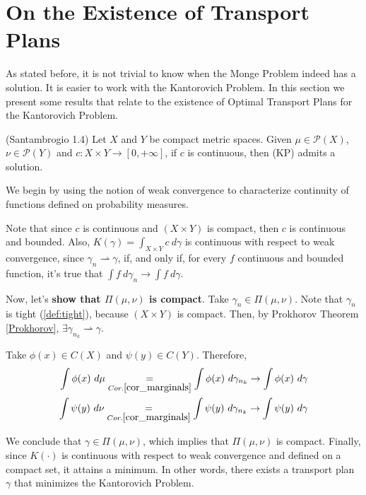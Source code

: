 \newpage
\section{On the Existence of Transport Plans}
As stated before, it is not trivial to know when the Monge Problem
indeed has a solution. It is easier to work with the Kantorovich
Problem. In this section we present some results that relate
to the existence of Optimal Transport Plans for the Kantorovich Problem.

\begin{theorem}(Santambrogio 1.4)
  Let $X$ and $Y$ be compact metric spaces.
  Given $\mu\in \mathcal{P}(X)$, $\nu \in \mathcal P(Y)$ and
  $c:X\times Y \to[0,+\infty]$, if $c$ is continuous, then
  (KP) admits a solution.
  \label{thm:Santambrogio1.4}
\end{theorem}
\begin{prf}
  We begin by using the notion of weak convergence to characterize
  continuity of functions defined on probability measures.

  Note that since $c$ is continuous and $(X \times Y)$ is compact,
  then $c$ is continuous and bounded. Also,
  $K(\gamma) = \int_{X\times Y}c \ d\gamma$ is continuous with respect to weak
  convergence, since
  $\gamma_n \rightharpoonup \gamma$, if, and only if, for every $f$ continuous
  and bounded function, it's true that $\int f \ d\gamma_n \to \int f \ d\gamma$.

  Now, let's \textbf{show that $\Pi(\mu,\nu)$ is compact}.
  Take $\gamma_n \in \Pi(\mu,\nu)$. Note that $\gamma_n$ is tight (\ref{def:tight}),
  because $(X\times Y)$ is compact. Then, by Prokhorov Theorem \ref{Prokhorov},
  $\exists \gamma_{n_k} \rightharpoonup \gamma$.

  Take $\phi(x) \in C(X)$ and $\psi(y) \in C(Y)$. Therefore,
  \begin{equation*}
    \begin{split}
      \int \phi(x) \ d\mu
      \underset{Cor.\ref{cor_marginals}}{=}
      \int\phi(x)\ d\gamma_{n_k}
      \to
      \int \phi(x) \ d\gamma \\
      \int \psi(y) \ d\nu
      \underset{Cor.\ref{cor_marginals}}{=}
      \int\psi(y)\ d\gamma_{n_k}
      \to
      \int \psi(y) \ d\gamma
    \end{split}
  \end{equation*}

  We conclude that $\gamma \in \Pi(\mu,\nu)$, which implies that
  $\Pi(\mu,\nu)$ is compact. Finally, since $K(\cdot)$ is continuous with respect to weak convergence
  and defined on a compact set, it attains a minimum. In other words,
  there exists a transport plan $\gamma$ that minimizes the Kantorovich
  Problem.
\end{prf}

